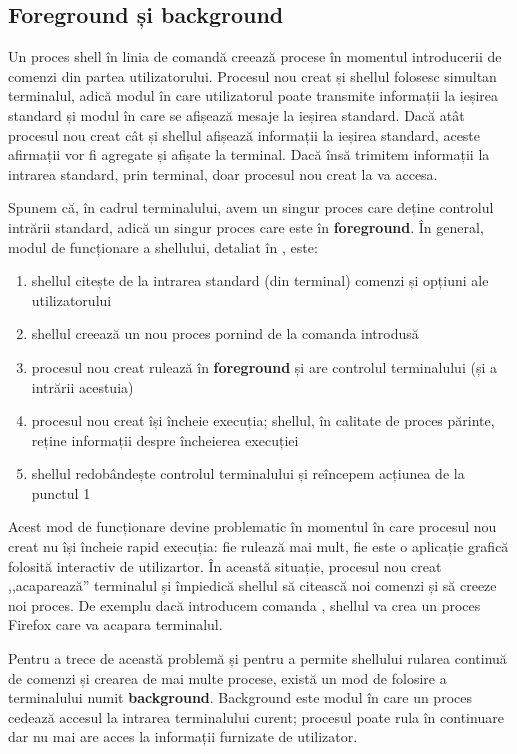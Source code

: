 \subsection{Foreground și background}
\label{sec:process:foreground-background}

Un proces shell în linia de comandă creează procese în momentul introducerii de
comenzi din partea utilizatorului. Procesul nou creat și shellul folosesc
simultan terminalul, adică modul în care utilizatorul poate transmite informații
la ieșirea standard și modul în care se afișează mesaje la ieșirea standard.
Dacă atât procesul nou creat cât și shellul afișează informații la ieșirea
standard, aceste afirmații vor fi agregate și afișate la terminal. Dacă însă
trimitem informații la intrarea standard, prin terminal, doar procesul nou creat
la va accesa.

Spunem că, în cadrul terminalului, avem un singur proces care deține controlul
intrării standard, adică un singur proces care este în \textbf{foreground}. În
general, modul de funcționare a shellului, detaliat în , este:

\begin{enumerate}
	\item shellul citește de la intrarea standard (din terminal) comenzi și
		opțiuni ale utilizatorului
	\item shellul creează un nou proces pornind de la comanda introdusă
        \item procesul nou creat rulează în \textbf{foreground} și are controlul
		terminalului (și a intrării acestuia)
	\item procesul nou creat își încheie execuția; shellul, în calitate de
		proces părinte, reține informații despre încheierea execuției
	\item shellul redobândește controlul terminalului și reîncepem acțiunea
		de la punctul 1
\end{enumerate}

Acest mod de funcționare devine problematic în momentul în care procesul nou
creat nu își încheie rapid execuția: fie rulează mai mult, fie este o aplicație
grafică folosită interactiv de utilizartor. În această situație, procesul nou
creat ,,acaparează'' terminalul și împiedică shellul să citească noi comenzi și
să creeze noi proces. De exemplu dacă introducem comanda , shellul va
crea un proces Firefox care va acapara terminalul.

Pentru a trece de această problemă și pentru a permite shellului rularea
continuă de comenzi și crearea de mai multe procese, există un mod de folosire a
terminalului numit \textbf{background}. Background este modul în care un proces
cedează accesul la intrarea terminalului curent; procesul poate rula în
continuare dar nu mai are acces la informații furnizate de utilizator.

